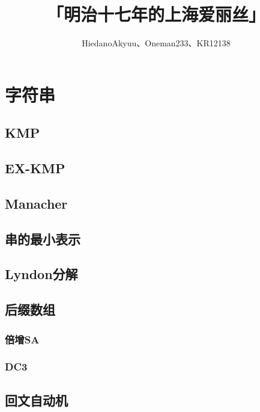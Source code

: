 \documentclass[twocolumn,a4]{article}
\title{\CJKfamily{hei} \bfseries 「明治十七年的上海爱丽丝」}
\author{HiedanoAkyuu、Oneman233、KR12138}
\newcommand{\addcpp}[1]{}
\begin{document}
 \small
\begin{titlepage}
\maketitle
\end{titlepage}

\newpage
\pagestyle{empty}
\renewcommand{\contentsname}{目录}
\tableofcontents
\newpage\clearpage
\newpage
\pagestyle{fancy}
\setcounter{page}{1}   %

\section{字符串}
	\subsection{KMP}
		\addcpp{string/KMP}
	\subsection{EX-KMP}
		\addcpp{string/EX-KMP}
	\subsection{Manacher}
		\addcpp{string/manacher}
	\subsection{串的最小表示}
	\subsection{Lyndon分解}
		\addcpp{string/LyndonFactorization}
	\subsection{后缀数组}
		\subsubsection{倍增SA}
			\addcpp{string/sa_da}
		\subsubsection{DC3}
	\subsection{回文自动机}
		\addcpp{string/PAM}
\end{document}
